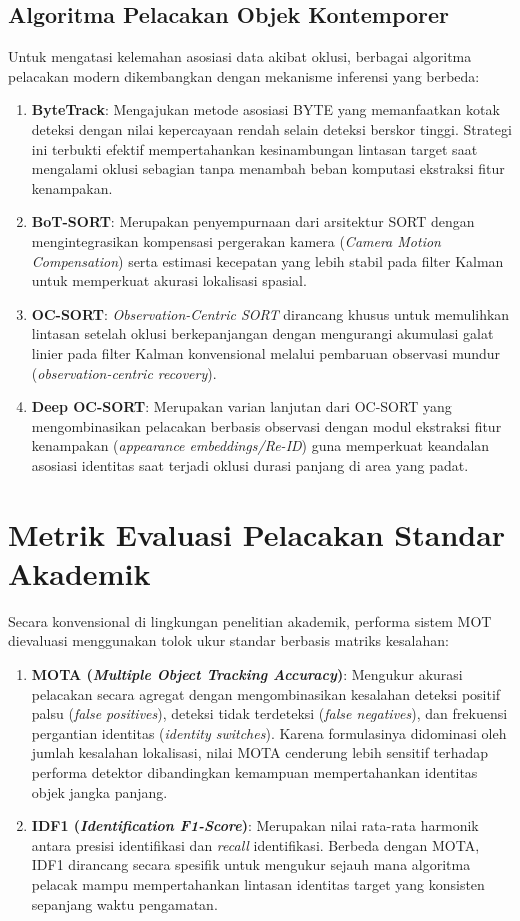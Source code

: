 \subsection{Algoritma Pelacakan Objek Kontemporer}
Untuk mengatasi kelemahan asosiasi data akibat oklusi, berbagai algoritma pelacakan modern dikembangkan dengan mekanisme inferensi yang berbeda:
\begin{enumerate}
    \item \textbf{ByteTrack}: Mengajukan metode asosiasi BYTE yang memanfaatkan kotak deteksi dengan nilai kepercayaan rendah selain deteksi berskor tinggi. Strategi ini terbukti efektif mempertahankan kesinambungan lintasan target saat mengalami oklusi sebagian tanpa menambah beban komputasi ekstraksi fitur kenampakan.
    \item \textbf{BoT-SORT}: Merupakan penyempurnaan dari arsitektur SORT dengan mengintegrasikan kompensasi pergerakan kamera (\textit{Camera Motion Compensation}) serta estimasi kecepatan yang lebih stabil pada filter Kalman untuk memperkuat akurasi lokalisasi spasial.
    \item \textbf{OC-SORT}: \textit{Observation-Centric SORT} dirancang khusus untuk memulihkan lintasan setelah oklusi berkepanjangan dengan mengurangi akumulasi galat linier pada filter Kalman konvensional melalui pembaruan observasi mundur (\textit{observation-centric recovery}).
    \item \textbf{Deep OC-SORT}: Merupakan varian lanjutan dari OC-SORT yang mengombinasikan pelacakan berbasis observasi dengan modul ekstraksi fitur kenampakan (\textit{appearance embeddings/Re-ID}) guna memperkuat keandalan asosiasi identitas saat terjadi oklusi durasi panjang di area yang padat.
\end{enumerate}

\section{Metrik Evaluasi Pelacakan Standar Akademik}

Secara konvensional di lingkungan penelitian akademik, performa sistem MOT dievaluasi menggunakan tolok ukur standar berbasis matriks kesalahan:
\begin{enumerate}
    \item \textbf{MOTA (\textit{Multiple Object Tracking Accuracy})}: Mengukur akurasi pelacakan secara agregat dengan mengombinasikan kesalahan deteksi positif palsu (\textit{false positives}), deteksi tidak terdeteksi (\textit{false negatives}), dan frekuensi pergantian identitas (\textit{identity switches}). Karena formulasinya didominasi oleh jumlah kesalahan lokalisasi, nilai MOTA cenderung lebih sensitif terhadap performa detektor dibandingkan kemampuan mempertahankan identitas objek jangka panjang.
    \item \textbf{IDF1 (\textit{Identification F1-Score})}: Merupakan nilai rata-rata harmonik antara presisi identifikasi dan \textit{recall} identifikasi. Berbeda dengan MOTA, IDF1 dirancang secara spesifik untuk mengukur sejauh mana algoritma pelacak mampu mempertahankan lintasan identitas target yang konsisten sepanjang waktu pengamatan.
\end{enumerate}

